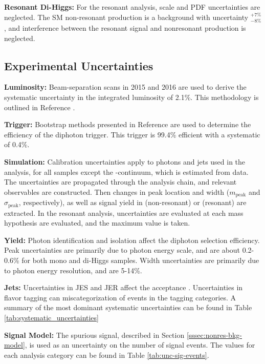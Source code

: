 \noindent\textbf{Resonant Di-Higgs:} For the resonant analysis, scale and \gls{PDF} uncertainties are neglected. The \gls{SM} non-resonant \hh production is a background with uncertainty $^{+7\%}_{-8\%}$, and interference between the resonant \hh signal and nonresonant \hh production is neglected.

\subsection{Experimental Uncertainties} \label{ssec:exp-unc}

\noindent\textbf{Luminosity:} Beam-separation scans in 2015 and 2016 are used to derive the systematic uncertainty in the integrated luminosity of 2.1\%. This methodology is outlined in Reference \cite{lumi-unc}.

\noindent\textbf{Trigger:} Bootstrap methods presented in Reference \cite{trigger-unc} are used to determine the efficiency of the diphoton trigger. This trigger is 99.4\% efficient with a systematic of 0.4\%.

\noindent\textbf{Simulation:} Calibration uncertainties apply to photons and jets used in the analysis, for all samples except the \yy-continuum, which is estimated from data. The uncertainties are propagated through the analysis chain, and relevant observables are constructed. Then changes in peak location and width ($m_{\text{peak}}$ and $\sigma_{\text{peak}}$, respectively), as well as signal yield in \myy (non-resonant) or \myybb (resonant) are extracted. In the resonant analysis, uncertainties are evaluated at each mass hypothesis are evaluated, and the maximum value is taken.

\noindent\textbf{Yield:} Photon identification and isolation affect the diphoton selection efficiency. Peak uncertainties are primarily due to photon energy scale, and are about 0.2-0.6\% for both mono and di-Higgs samples. Width uncertainties are primarily due to photon energy resolution, and are 5-14\%. 

\noindent\textbf{Jets:} Uncertainties in \gls{JES} and \gls{JER} affect the \mbb acceptance \cite{jes-uncertainty}.  Uncertainties in flavor tagging can miscategorization of events in the tagging categories. A summary of the most dominant systematic uncertainties can be found in Table \ref{tab:systematic_uncertainties}

\noindent\textbf{Signal Model:} The spurious signal, described in Section \ref{sssec:nonres-bkg-model}, is used as an uncertainty on the number of signal events. The values for each analysis category can be found in Table \ref{tab:unc-sig-events}.

